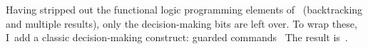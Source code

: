 \documentclass[manuscript,screen 12pt, nonacm]{acmart}
\begin{document}
        Having stripped out the functional logic programming elements of~\VC
        (backtracking and multiple results), only the decision-making bits are
        left over. To wrap these, I~add a classic decision-making construct:
        guarded commands~\citep{dijkstra} The result is~\VMinus. 






\end{document}
